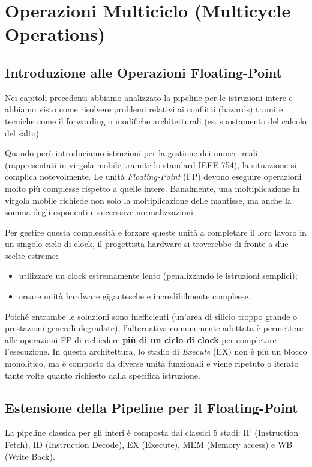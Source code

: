 \chapter{Operazioni Multiciclo (Multicycle Operations)}

\section{Introduzione alle Operazioni Floating-Point}
Nei capitoli precedenti abbiamo analizzato la pipeline per le istruzioni intere e abbiamo visto come risolvere problemi relativi ai conflitti (hazards) tramite tecniche come il forwarding o modifiche architetturali (es. spostamento del calcolo del salto). 

Quando però introduciamo istruzioni per la gestione dei numeri reali (rappresentati in virgola mobile tramite lo standard IEEE 754), la situazione si complica notevolmente. Le unità \textit{Floating-Point} (FP) devono eseguire operazioni molto più complesse rispetto a quelle intere. Banalmente, una moltiplicazione in virgola mobile richiede non solo la moltiplicazione delle mantisse, ma anche la somma degli esponenti e successive normalizzazioni.

Per gestire questa complessità e forzare queste unità a completare il loro lavoro in un singolo ciclo di clock, il progettista hardware si troverebbe di fronte a due scelte estreme:
\begin{itemize}
    \item utilizzare un clock estremamente lento (penalizzando le istruzioni semplici);
    \item creare unità hardware gigantesche e incredibilmente complesse.
\end{itemize}

Poiché entrambe le soluzioni sono inefficienti (un'area di silicio troppo grande o prestazioni generali degradate), l'alternativa comunemente adottata è permettere alle operazioni FP di richiedere \textbf{più di un ciclo di clock} per completare l'esecuzione. In questa architettura, lo stadio di \textit{Execute} (EX) non è più un blocco monolitico, ma è composto da diverse unità funzionali e viene ripetuto o iterato tante volte quanto richiesto dalla specifica istruzione.

\section{Estensione della Pipeline per il Floating-Point}
La pipeline classica per gli interi è composta dai classici 5 stadi: IF (Instruction Fetch), ID (Instruction Decode), EX (Execute), MEM (Memory access) e WB (Write Back). 

